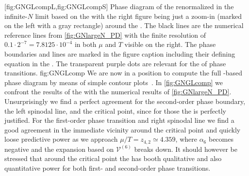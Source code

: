 	[fig:GNGLcompL,fig:GNGLcompS]%
	{%
		Phase diagram of the renormalized \gnm{} in the infinite-$N$ limit based on the \gle{} with the right figure  being just a zoom-in (marked on the left  with a gray rectangle) around the \cp{}.
		The black lines are the numerical reference lines from \cref{fig:GNlargeN_PD} with the finite resolution of $0.1\cdot 2^{-7}=7.8125\cdot 10^{-4}$ in both $\mu$ and $T$ visible on the right.
		The \gl{} phase boundaries and lines are marked in the figure caption including their defining equation in the \gle{}. 
		The transparent purple dots are relevant for the  of phase transitions.
	}%
	{fig:GNGLcomp}%
We are now in a position to compute the full \gl{}-based phase diagram by means of simple contour plots~\cite{Steil:2023PhDThermodynamicsNB}.
In \cref{fig:GNGLcomp} we confront the results of the \gle{} with the numerical results of \cref{fig:GNlargeN_PD}. 
Unsurprisingly we find a perfect agreement for the second-order phase boundary, the left spinodal line, and the critical point, since for those the \gle{} is perfectly justified.
For the first-order phase transition and right spinodal line we find a good agreement in the immediate vicinity around the critical point and quickly loose predictive power as we approach $\mu/T=z_{4,2}\simeq 4.359$, where $\alpha_6$ becomes negative and the expansion based on $\mathcal{V}^{(6)}$ breaks down.
It should however be stressed that around the critical point the \gle{} has booth qualitative and also quantitative power for both first- and second-order phase transitions.

